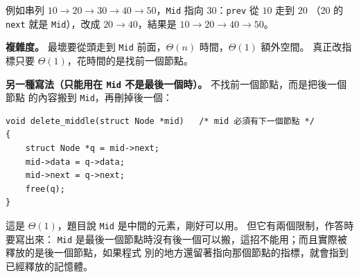\begin{pastsoln}
例如串列 $10 \to 20 \to 30 \to 40 \to 50$，\texttt{Mid} 指向 $30$：\texttt{prev} 從 $10$ 走到 $20$
（$20$ 的 \texttt{next} 就是 \texttt{Mid}），改成 $20 \to 40$，結果是 $10 \to 20 \to 40 \to 50$。

\textbf{複雜度。} 最壞要從頭走到 \texttt{Mid} 前面，$\Theta(n)$ 時間，$\Theta(1)$ 額外空間。
真正改指標只要 $\Theta(1)$，花時間的是找前一個節點。

\textbf{另一種寫法（只能用在 \texttt{Mid} 不是最後一個時）。} 不找前一個節點，而是把後一個節點
的內容搬到 \texttt{Mid}，再刪掉後一個：
\begin{verbatim}
void delete_middle(struct Node *mid)   /* mid 必須有下一個節點 */
{
    struct Node *q = mid->next;
    mid->data = q->data;
    mid->next = q->next;
    free(q);
}
\end{verbatim}
這是 $\Theta(1)$，題目說 \texttt{Mid} 是中間的元素，剛好可以用。 但它有兩個限制，作答時要寫出來：
\texttt{Mid} 是最後一個節點時沒有後一個可以搬，這招不能用；而且實際被釋放的是後一個節點，如果程式
別的地方還留著指向那個節點的指標，就會指到已經釋放的記憶體。
\end{pastsoln}
